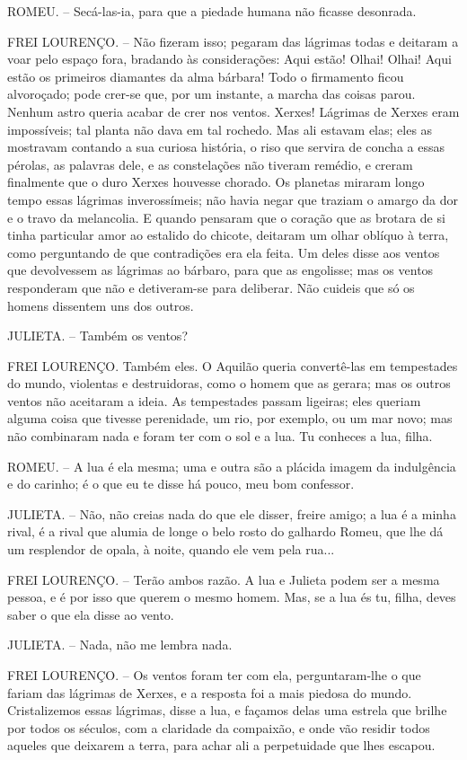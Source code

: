 ROMEU. -- Secá-las-ia, para que a piedade humana não ficasse desonrada.

FREI LOURENÇO. -- Não fizeram isso; pegaram das lágrimas todas e
deitaram a voar pelo espaço fora, bradando às considerações: Aqui estão!
Olhai! Olhai! Aqui estão os primeiros diamantes da alma bárbara! Todo o
firmamento ficou alvoroçado; pode crer-se que, por um instante, a marcha
das coisas parou. Nenhum astro queria acabar de crer nos ventos. Xerxes!
Lágrimas de Xerxes eram impossíveis; tal planta não dava em tal rochedo.
Mas ali estavam elas; eles as mostravam contando a sua curiosa história,
o riso que servira de concha a essas pérolas, as palavras dele, e as
constelações não tiveram remédio, e creram finalmente que o duro Xerxes
houvesse chorado. Os planetas miraram longo tempo essas lágrimas
inverossímeis; não havia negar que traziam o amargo da dor e o travo da
melancolia. E quando pensaram que o coração que as brotara de si tinha
particular amor ao estalido do chicote, deitaram um olhar oblíquo à
terra, como perguntando de que contradições era ela feita. Um deles
disse aos ventos que devolvessem as lágrimas ao bárbaro, para que as
engolisse; mas os ventos responderam que não e detiveram-se para
deliberar. Não cuideis que só os homens dissentem uns dos outros.

JULIETA. -- Também os ventos?

FREI LOURENÇO. Também eles. O Aquilão queria convertê-las em tempestades
do mundo, violentas e destruidoras, como o homem que as gerara; mas os
outros ventos não aceitaram a ideia. As tempestades passam ligeiras;
eles queriam alguma coisa que tivesse perenidade, um rio, por exemplo,
ou um mar novo; mas não combinaram nada e foram ter com o sol e a lua.
Tu conheces a lua, filha.

ROMEU. -- A lua é ela mesma; uma e outra são a plácida imagem da
indulgência e do carinho; é o que eu te disse há pouco, meu bom
confessor.

JULIETA. -- Não, não creias nada do que ele disser, freire amigo; a lua
é a minha rival, é a rival que alumia de longe o belo rosto do galhardo
Romeu, que lhe dá um resplendor de opala, à noite, quando ele vem pela
rua...

FREI LOURENÇO. -- Terão ambos razão. A lua e Julieta podem ser a mesma
pessoa, e é por isso que querem o mesmo homem. Mas, se a lua és tu,
filha, deves saber o que ela disse ao vento.

JULIETA. -- Nada, não me lembra nada.

FREI LOURENÇO. -- Os ventos foram ter com ela, perguntaram-lhe o que
fariam das lágrimas de Xerxes, e a resposta foi a mais piedosa do mundo.
Cristalizemos essas lágrimas, disse a lua, e façamos delas uma estrela
que brilhe por todos os séculos, com a claridade da compaixão, e onde
vão residir todos aqueles que deixarem a terra, para achar ali a
perpetuidade que lhes escapou.

